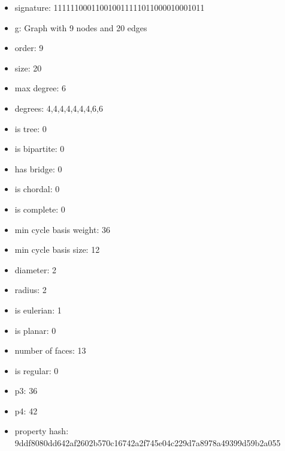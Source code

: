 \newpage
\begin{figure}
\end{figure}
\begin{itemize}
\item signature: 111111000110010011111011000010001011
\item g: Graph with 9 nodes and 20 edges
\item order: 9
\item size: 20
\item max degree: 6
\item degrees: 4,4,4,4,4,4,4,6,6
\item is tree: 0
\item is bipartite: 0
\item has bridge: 0
\item is chordal: 0
\item is complete: 0
\item min cycle basis weight: 36
\item min cycle basis size: 12
\item diameter: 2
\item radius: 2
\item is eulerian: 1
\item is planar: 0
\item number of faces: 13
\item is regular: 0
\item p3: 36
\item p4: 42
\item property hash: 9ddf8080dd642af2602b570c16742a2f745e04c229d7a8978a49399d59b2a055
\end{itemize}
